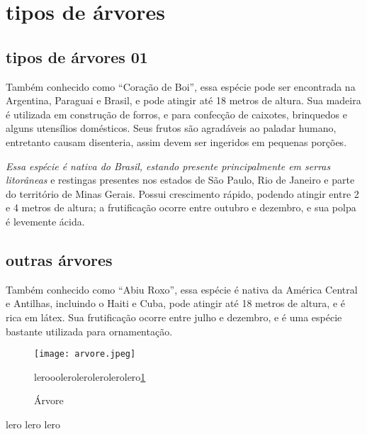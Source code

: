 \documentclass[a4paper,12pt]{article}
\begin{document}
\maketitle
\section{tipos de árvores}%
\subsection{tipos de árvores 01}%

\begin{flushrileft}%
Também conhecido como “Coração de Boi”, essa espécie pode ser encontrada na Argentina, Paraguai e Brasil, e pode atingir até 18 metros de altura. Sua madeira é utilizada em construção de forros, e para confecção de caixotes, brinquedos e alguns utensílios domésticos. Seus frutos são agradáveis ao paladar humano, entretanto causam disenteria, assim devem ser ingeridos em pequenas porções.
\end{flushrileft}%

\begin{center}%
\textit{Essa espécie é nativa do Brasil, estando presente principalmente em serras litorâneas} %
e restingas presentes nos estados de São Paulo, Rio de Janeiro e parte do território de Minas Gerais. Possui crescimento rápido, podendo atingir entre 2 e 4 metros de altura; a frutificação ocorre entre outubro e dezembro, e sua polpa é levemente ácida.
\end{center}%

\begin{flushright}%
\subsection{outras árvores}
Também conhecido como “Abiu Roxo”, essa espécie é nativa da América Central e Antilhas, incluindo o Haiti e Cuba, pode atingir até 18 metros de altura, e é rica em látex. Sua frutificação ocorre entre julho e dezembro, e é uma espécie bastante utilizada para ornamentação.
\end{flushright}

\begin{figure}[ht]
    \texttt{[image: arvore.jpeg]}
    \caption{Árvore}
    \label{fig0}

lerooolerolerolerolerolero\ref{fig0}
\end{figure}
lero lero lero
\end{document}
